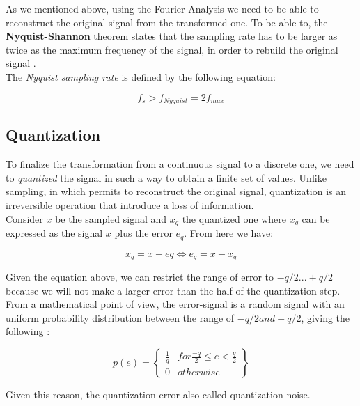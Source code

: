\noindent As we mentioned above, using the Fourier Analysis we need to be able to reconstruct the original signal from the transformed one. To be able to, the \textbf{Nyquist-Shannon} theorem states that the sampling rate has to be larger as twice as the maximum frequency of the signal, in order to rebuild the original signal \cite{sampling_illinois}.\\
\noindent The \textit{Nyquist sampling rate} is defined by the following equation:

\begin{equation}
f_{s} > f_{Nyquist} = 2f_{max}
\end{equation}


\subsection{Quantization}
\label{subs:quantization}
To finalize the transformation from a continuous signal to a discrete one, we need to \textit{quantized} the signal in such a way to obtain a finite set of values. Unlike sampling, in which permits to reconstruct the original signal, quantization is an irreversible operation that introduce a loss of information. \\
\noindent Consider $x$ be the sampled signal and $x_{q}$ the quantized one where $x_{q}$ can be expressed as the signal $x$ plus the error $e_{q}$. From here we have:

\begin{equation}
x_{q} = x + e{q} \Leftrightarrow e_{q} = x - x_{q}
\end{equation}

\noindent Given the equation above, we can restrict the range of error to $-q/2 ... +q/2$ because we will not make a larger error than the half of the quantization step. From a mathematical point of view, the error-signal is a random signal with an uniform probability distribution between the range of $−q/2 and +q/2$, giving the following \cite{quantization_math}:

\begin{equation}
p(e) = \begin{Bmatrix}
			\frac{1}{q} & for \frac{-q}{2} \leq  e < \frac{q}{2}\\
			0 			& otherwise
		\end{Bmatrix}
\end{equation}

Given this reason, the quantization error also called quantization noise.

